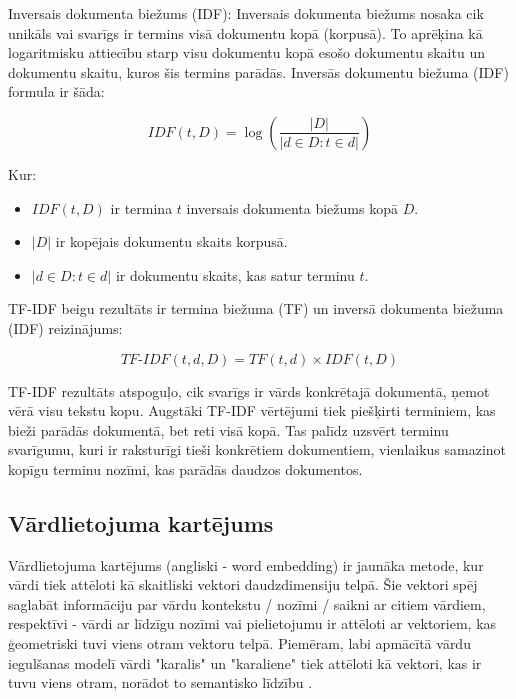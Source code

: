 Inversais dokumenta biežums (IDF):
Inversais dokumenta biežums nosaka cik unikāls vai svarīgs ir termins visā dokumentu kopā (korpusā). To aprēķina kā logaritmisku attiecību starp visu dokumentu kopā esošo dokumentu skaitu un dokumentu skaitu, kuros šis termins parādās. Inversās dokumentu biežuma (IDF) formula ir šāda:

\begin{equation}
IDF(t, D) = \log\left(\frac{|D|}{|{d \in D : t \in d}|}\right)
\end{equation}

\noindent Kur:
\begin{itemize}
\item \(IDF(t, D)\) ir termina \(t\) inversais dokumenta biežums kopā \(D\).
\item \(|D|\) ir kopējais dokumentu skaits korpusā.
\item \(|{d \in D : t \in d}|\) ir dokumentu skaits, kas satur terminu \(t\).
\end{itemize}

TF-IDF beigu rezultāts ir termina biežuma (TF) un inversā dokumenta biežuma (IDF) reizinājums:

\begin{equation}
TF\text{-}IDF(t, d, D) = TF(t, d) \times IDF(t, D)
\end{equation}

TF-IDF rezultāts atspoguļo, cik svarīgs ir vārds konkrētajā dokumentā, ņemot vērā visu tekstu kopu. Augstāki TF-IDF vērtējumi tiek piešķirti terminiem, kas bieži parādās dokumentā, bet reti visā kopā. Tas palīdz uzsvērt terminu svarīgumu, kuri ir raksturīgi tieši konkrētiem dokumentiem, vienlaikus samazinot kopīgu terminu nozīmi, kas parādās daudzos dokumentos.

\subsection{Vārdlietojuma kartējums}
Vārdlietojuma kartējums (angliski - word embedding) ir jaunāka metode, kur vārdi tiek attēloti kā skaitliski vektori daudzdimensiju telpā. Šie vektori spēj saglabāt informāciju par vārdu kontekstu / nozīmi / saikni ar citiem vārdiem, respektīvi -  vārdi ar līdzīgu nozīmi vai pielietojumu ir attēloti ar vektoriem, kas ģeometriski tuvi viens otram vektoru telpā. Piemēram, labi apmācītā vārdu iegulšanas modelī vārdi "karalis" un "karaliene" tiek attēloti kā vektori, kas ir tuvu viens otram, norādot to semantisko līdzību \cite{BaeldungEmbedding}.

